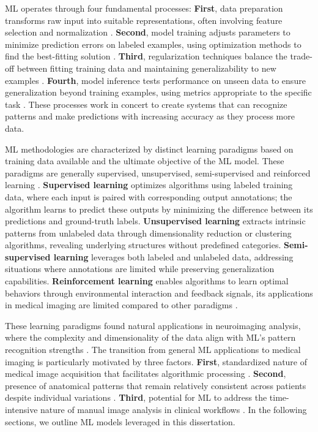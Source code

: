 ML operates through four fundamental processes: \textbf{First}, data preparation transforms raw input into suitable representations, often involving feature selection and normalization  \cite{Mwangi2014-nl}. \textbf{Second}, model training adjusts parameters to minimize prediction errors on labeled examples, using optimization methods to find the best-fitting solution \cite{Lemm2011-jm}. \textbf{Third}, regularization techniques balance the trade-off between fitting training data and maintaining generalizability to new examples \cite{Roberts2021-ib}. \textbf{Fourth}, model inference tests performance on unseen data to ensure generalization beyond training examples, using metrics appropriate to the specific task \cite{Varoquaux2022-as}.  These processes work in concert to create systems that can recognize patterns and make predictions with increasing accuracy as they process more data.

ML methodologies are characterized by distinct learning paradigms based on training data available and the ultimate objective of the ML model. These paradigms are generally supervised, unsupervised, semi-supervised and reinforced learning \cite{Hastie2009-ef}. \textbf{Supervised learning} optimizes algorithms using labeled training data, where each input is paired with corresponding output annotations; the algorithm learns to predict these outputs by minimizing the difference between its predictions and ground-truth labels. \textbf{Unsupervised learning} extracts intrinsic patterns from unlabeled data through dimensionality reduction or clustering algorithms, revealing underlying structures without predefined categories. \textbf{Semi-supervised learning} leverages both labeled and unlabeled data, addressing situations where annotations are limited while preserving generalization capabilities. \textbf{Reinforcement learning} enables algorithms to learn optimal behaviors through environmental interaction and feedback signals, its applications in medical imaging are limited compared to other paradigms \cite{Zhou2021-au}. 

These learning paradigms found natural applications in neuroimaging analysis, where the complexity and dimensionality of the data align with ML's pattern recognition strengths \cite{Vieira2017-vr}. The transition from general ML applications to medical imaging is particularly motivated by three factors. \textbf{First},  standardized nature of medical image acquisition that facilitates algorithmic processing  \cite{Li2020-dy}. \textbf{Second}, presence of anatomical patterns that remain relatively consistent across patients despite individual variations \cite{Iglesias2023-co}. \textbf{Third},  potential for ML to address the time-intensive nature of manual image analysis in clinical workflows \cite{Khalifa2024-dn}. In the following sections, we outline ML models leveraged in this dissertation. 

